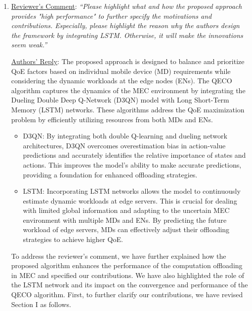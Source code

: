 \documentclass[12pt,draftclsnofoot,onecolumn]{IEEEtran}
\begin{document}
\begin{enumerate}
\vspace{6mm}

\item \underline{Reviewer's Comment}: 
\textit{``Please highlight what and how the proposed approach provides "high performance" to further specify the motivations and contributions. Especially, please highlight the reason why the authors design the framework by integrating LSTM. Otherwise, it will make the innovations seem weak.''} \newline

\underline{Authors' Reply}: The proposed approach is designed to balance and prioritize QoE factors based on individual mobile device (MD) requirements while considering the dynamic workloads at the edge nodes (ENs). The QECO algorithm captures the dynamics of the MEC environment by integrating the Dueling Double Deep Q-Network (D3QN) model with Long Short-Term Memory (LSTM) networks. These algorithms address the QoE maximization problem by efficiently utilizing resources from both MDs and ENs.
\begin{itemize}
	
	\item D3QN: By integrating both double Q-learning and dueling network architectures, D3QN overcomes overestimation bias in action-value predictions and accurately identifies the relative importance of states and actions. This improves the model's ability to make accurate predictions, providing a foundation for enhanced offloading strategies.\vspace{2mm}
	
	\item LSTM: Incorporating LSTM networks allows the model to continuously estimate dynamic workloads at edge servers. This is crucial for dealing with limited global information and adapting to the uncertain MEC environment with multiple MDs and ENs. By predicting the future workload of edge servers, MDs can effectively adjust their offloading strategies to achieve higher QoE.\vspace{2mm}
	
\end{itemize}




To address the reviewer’s comment, we have further explained how the proposed algorithm enhances the performance of the computation offloading in MEC and specified our contributions. We have also highlighted the role of the LSTM network and its impact on the convergence and performance of the QECO algorithm. First, to further clarify our contributions, we have revised Section I as follows.


\end{enumerate}
\end{document}
